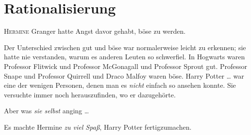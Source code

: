 \chapter{Rationalisierung}


\lettrine{H}{ermine} Granger hatte Angst davor gehabt, böse zu werden.

\hplettrineextrapara
Der Unterschied zwischen gut und böse war normalerweise leicht zu erkennen; sie hatte nie verstanden, warum es anderen Leuten so schwerfiel. In Hogwarts waren Professor Flitwick und Professor McGonagall und Professor Sprout gut. Professor Snape und Professor Quirrell und Draco Malfoy waren böse. Harry Potter … war eine der wenigen Personen, denen man es \emph{nicht} einfach so ansehen konnte. Sie versuchte immer noch herauszufinden, wo er dazugehörte.

Aber was \emph{sie selbst} anging …

Es machte Hermine \emph{zu viel Spaß}, Harry Potter fertigzumachen.

